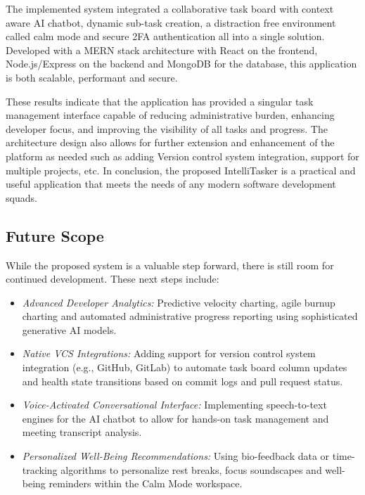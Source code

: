 \documentclass[conference]{IEEEtran}
\begin{document}
The implemented system integrated a collaborative task board with context aware AI chatbot, dynamic sub-task creation, a distraction free environment called calm mode and secure 2FA authentication all into a single solution. Developed with a MERN stack architecture with React on the frontend, Node.js/Express on the backend and MongoDB for the database, this application is both scalable, performant and secure.

These results indicate that the application has provided a singular task management interface capable of reducing administrative burden, enhancing developer focus, and improving the visibility of all tasks and progress. The architecture design also allows for further extension and enhancement of the platform as needed such as adding Version control system integration, support for multiple projects, etc. In conclusion, the proposed IntelliTasker is a practical and useful application that meets the needs of any modern software development squads.

\subsection{Future Scope}
While the proposed system is a valuable step forward, there is still room for continued development. These next steps include:
\begin{itemize}
    \item \textit{Advanced Developer Analytics:} Predictive velocity charting, agile burnup charting and automated administrative progress reporting using sophisticated generative AI models.
    \item \textit{Native VCS Integrations:} Adding support for version control system integration (e.g., GitHub, GitLab) to automate task board column updates and health state transitions based on commit logs and pull request status.
    \item \textit{Voice-Activated Conversational Interface:} Implementing speech-to-text engines for the AI chatbot to allow for hands-on task management and meeting transcript analysis.
    \item \textit{Personalized Well-Being Recommendations:} Using bio-feedback data or time-tracking algorithms to personalize rest breaks, focus soundscapes and well-being reminders within the Calm Mode workspace.
\end{itemize}
\end{document}
